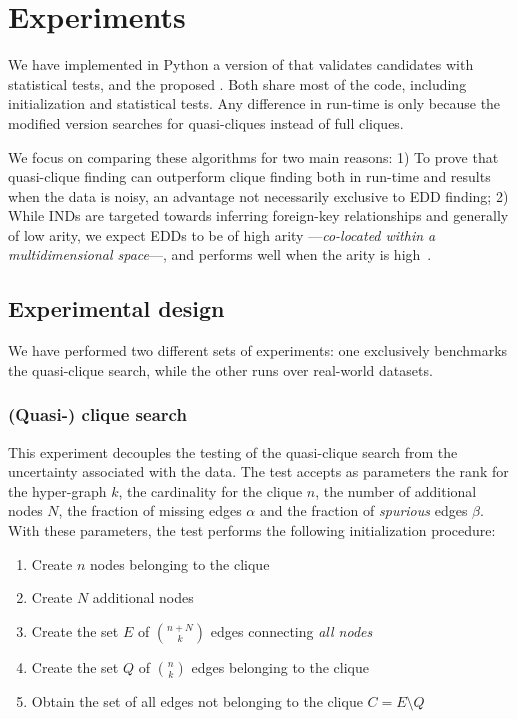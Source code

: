 \section{Experiments}
\label{sec:experiments}
We have implemented in Python a version of \Find that validates candidates with statistical
tests, and the proposed \PresQ.
Both share most of the code, including initialization and statistical
tests. Any difference in run-time is only because the modified version
searches for quasi-cliques instead of full cliques.

We focus on comparing these algorithms for two main reasons:
1) To prove that quasi-clique finding can outperform clique finding both in run-time and
results when the data is noisy, an advantage not necessarily exclusive to EDD finding;
2) While INDs are targeted towards inferring foreign-key relationships and generally of low arity,
we expect EDDs to be of high arity ---\emph{co-located within a multidimensional space}---,
and \Find performs well when the arity is high~\cite{Dursch2019}.

\subsection{Experimental design}
\label{sec:experiment_design}
We have performed two different sets of experiments: one exclusively benchmarks the
quasi-clique search, while the other runs over real-world datasets.

\subsubsection{(Quasi-) clique search}
This experiment decouples the testing of the quasi-clique search from the uncertainty
associated with the data. The test accepts as parameters the rank
for the hyper-graph $k$, the cardinality for the clique $n$, the number of additional
nodes $N$, the fraction of missing edges $\alpha$ and the fraction of \emph{spurious}
edges $\beta$.
With these parameters, the test performs the following initialization procedure:

\begin{enumerate}
    \item Create $n$ nodes belonging to the clique
    \item Create $N$ additional nodes
    \item Create the set $E$ of $\binom{n + N}{k}$ edges connecting \emph{all nodes}
    \item Create the set $Q$ of $\binom{n}{k}$ edges belonging to the clique
    \item Obtain the set of all edges not belonging to the clique $C = E \setminus Q$
\end{enumerate}

